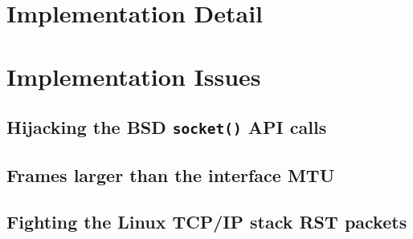 \documentclass[11pt,a4paper,british]{bhamarticle}
\begin{document}
\begin{multicols}{2}
\section{Implementation Detail}





\section{Implementation Issues}
\subsection{Hijacking the BSD \texttt{socket()} API calls} %

\subsection{Frames larger than the interface MTU}

\subsection{Fighting the Linux TCP/IP stack RST packets}


\end{multicols}
\end{document}
